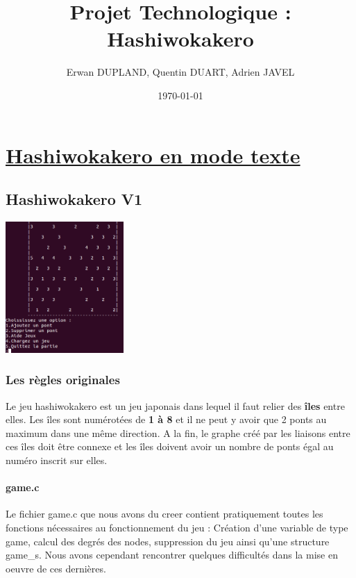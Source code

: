 \documentclass[12]{report}
\title{Projet Technologique : Hashiwokakero} %
\author{Erwan DUPLAND, Quentin DUART, Adrien JAVEL} %
\date\today{} %
\begin{document}
\renewcommand{\chaptername}{Partie} %
\renewcommand{\contentsname}{Sommaire} %

\maketitle %
\tableofcontents %

\part{\underline{Hashiwokakero en mode texte}}
	\chapter{Hashiwokakero V1}
		\includegraphics[height=5cm]{hashiwokakeroTEXTE.png} %
		\section{Les règles originales}
			Le jeu hashiwokakero est un jeu japonais dans lequel il faut relier des \textbf{îles} entre elles.
			Les îles sont numérotées de \textbf{1 à 8} et il ne peut y avoir que 2 ponts au maximum dans une même direction.
			A la fin, le graphe créé par les liaisons entre ces îles doit être connexe et les îles doivent avoir un nombre de
			ponts égal au numéro inscrit sur elles.
		\subsection{game.c}
			Le fichier game.c que nous avons du creer contient pratiquement toutes les fonctions nécessaires au fonctionnement du jeu :
			Création d'une variable de type game, calcul des degrés des nodes, suppression du jeu ainsi qu'une structure game\_s.
			Nous avons cependant rencontrer quelques difficultés dans la mise en oeuvre de ces dernières.
			
\end{document}
